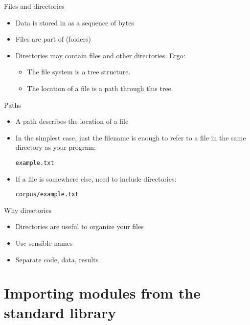 \documentclass[aspectratio=169,usenames,dvipsnames]{beamer}
\begin{document}
\begin{frame}{Files and directories}
    \begin{itemize}
        \item Data is stored in  as a sequence of bytes
        \item Files are part of  (folders)
        \item Directories may contain files and other directories. Ergo:
            \begin{itemize}
                \item The file system is a tree structure.
                \item The location of a file is a path through this tree.
            \end{itemize}
    \end{itemize}
\end{frame}

\begin{frame}{Paths}
    \begin{itemize}
        \item A path describes the location of a file
        \item In the simplest case, just the filename is enough to
            refer to a file in the same directory as your program:

            \texttt{example.txt}
        \item If a file is somewhere else, need to include directories:

            \texttt{corpus/example.txt}
    \end{itemize}
\end{frame}

\begin{frame}{Why directories}
    \begin{itemize}
        \item Directories are useful to organize your files
        \item Use sensible names
        \item Separate code, data, results
    \end{itemize}
\end{frame}



\section{Importing modules from the standard library}
\frame{\tableofcontents[currentsection]}
\end{document}
